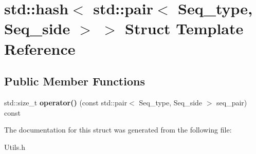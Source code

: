 \hypertarget{structstd_1_1hash_3_01std_1_1pair_3_01Seq__type_00_01Seq__side_01_4_01_4}{}\section{std\+:\+:hash$<$ std\+:\+:pair$<$ Seq\+\_\+type, Seq\+\_\+side $>$ $>$ Struct Template Reference}
\label{structstd_1_1hash_3_01std_1_1pair_3_01Seq__type_00_01Seq__side_01_4_01_4}
\subsection*{Public Member Functions}
\begin{DoxyCompactItemize}
\item 
\mbox{\label{structstd_1_1hash_3_01std_1_1pair_3_01Seq__type_00_01Seq__side_01_4_01_4_a5edefbb35d562192570b5d0acd4523be}} 
std\+::size\+\_\+t {\bfseries operator()} (const std\+::pair$<$ Seq\+\_\+type, Seq\+\_\+side $>$ seq\+\_\+pair) const
\end{DoxyCompactItemize}


The documentation for this struct was generated from the following file\+:\begin{DoxyCompactItemize}
\item 
Utils.\+h\end{DoxyCompactItemize}
